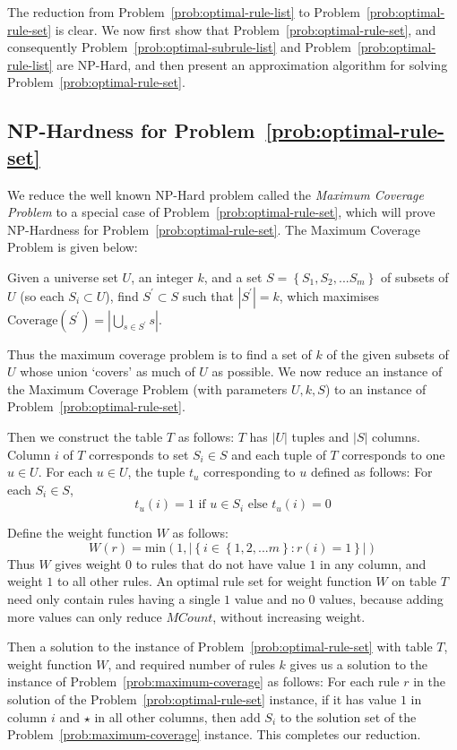 \noindent The reduction from Problem~\ref{prob:optimal-rule-list} to Problem~\ref{prob:optimal-rule-set} is clear. We now first show that Problem~\ref{prob:optimal-rule-set}, and consequently Problem~\ref{prob:optimal-subrule-list} and Problem~\ref{prob:optimal-rule-list} are NP-Hard, and then present an approximation algorithm for solving Problem~\ref{prob:optimal-rule-set}.

\subsection{NP-Hardness for Problem~\ref{prob:optimal-rule-set}}
We reduce the well known NP-Hard problem called the {\em Maximum Coverage Problem} to a special case of Problem~\ref{prob:optimal-rule-set}, which will prove NP-Hardness for Problem~\ref{prob:optimal-rule-set}. The Maximum Coverage Problem is given below: 
\begin{problem}\label{prob:maximum-coverage}
Given a universe set $U$, an integer $k$, and a set $S = \left\lbrace S_1, S_2, ... S_m \right\rbrace$ of subsets of $U$ (so each $S_i \subset U$), find $S^{\prime} \subset S$ such that $|S^{\prime}| = k$, which maximises $\text{Coverage}(S^{\prime}) = |\bigcup_{s \in S^{\prime}} s|$.
\end{problem}
Thus the maximum coverage problem is to find a set of $k$ of the given subsets of $U$ whose union `covers' as much of $U$ as possible. We now reduce an instance of the Maximum Coverage Problem (with parameters $U, k, S$) to an instance of Problem~\ref{prob:optimal-rule-set}. 

Then we construct the table $T$ as follows: $T$ has $|U|$ tuples and $|S|$ columns. Column $i$ of $T$ corresponds to set $S_i \in S$ and each tuple of $T$ corresponds to one $u \in U$. For each $u \in U$, the tuple $t_u$ corresponding to $u$ defined as follows: For each $S_i \in S$, $$t_u(i) = 1 \textrm{ if } u \in S_i \textrm{ else } t_u(i) = 0$$

Define the weight function $W$ as follows:
$$W(r) = \textrm{min}(1, |\left\lbrace i \in \left\lbrace 1, 2, ... m \right\rbrace : r(i) = 1 \right\rbrace|)$$
Thus $W$ gives weight $0$ to rules that do not have value $1$ in any column, and weight $1$ to all other rules. An optimal rule set for weight function $W$ on table $T$ need only contain rules having a single $1$ value and no $0$ values, because adding more values can only reduce $MCount$, without increasing weight. 

Then a solution to the instance of Problem~\ref{prob:optimal-rule-set} with table $T$, weight function $W$, and required number of rules $k$ gives us a solution to the instance of Problem~\ref{prob:maximum-coverage} as follows: For each rule $r$ in the solution of the Problem~\ref{prob:optimal-rule-set} instance, if it has value $1$ in column $i$ and $\star$ in all other columns, then add $S_i$ to the solution set of the Problem~\ref{prob:maximum-coverage} instance. This completes our reduction.
 
